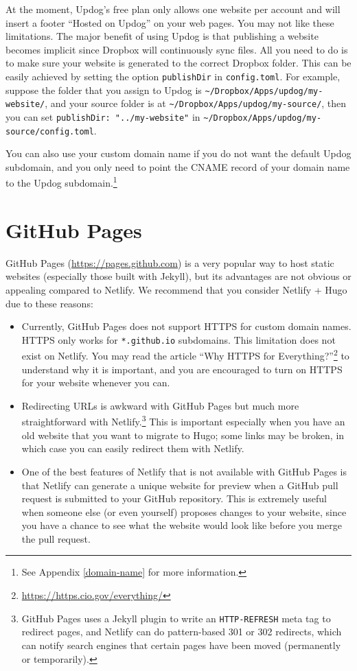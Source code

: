 \documentclass[12pt,]{krantz}
\renewcommand{\href}[2]{#2\footnote{\url{#1}}}
\theoremstyle{definition}
\theoremstyle{definition}
\theoremstyle{definition}
\theoremstyle{remark}
\begin{document}
At the moment, Updog's free plan only allows one website per account and
will insert a footer ``Hosted on Updog'' on your web pages. You may not
like these limitations. The major benefit of using Updog is that
publishing a website becomes implicit since Dropbox will continuously
sync files. All you need to do is to make sure your website is generated
to the correct Dropbox folder. This can be easily achieved by setting
the option \texttt{publishDir} in \texttt{config.toml}. For example,
suppose the folder that you assign to Updog is
\texttt{\textasciitilde{}/Dropbox/Apps/updog/my-website/}, and your
source folder is at
\texttt{\textasciitilde{}/Dropbox/Apps/updog/my-source/}, then you can
set \texttt{publishDir:\ "../my-website"} in
\texttt{\textasciitilde{}/Dropbox/Apps/updog/my-source/config.toml}.

You can also use your custom domain name if you do not want the default
Updog subdomain, and you only need to point the CNAME record of your
domain name to the Updog subdomain.\footnote{See Appendix
  \ref{domain-name} for more information.}

\section{GitHub Pages}\label{github-pages}

GitHub Pages (\url{https://pages.github.com})  is a
very popular way to host static websites (especially those built with
Jekyll), but its advantages are not obvious or appealing compared to
Netlify. We recommend that you consider Netlify + Hugo due to these
reasons:

\begin{itemize}
\item
  Currently, GitHub Pages does not support HTTPS for custom domain
  names. HTTPS only works for \texttt{*.github.io} subdomains. This
  limitation does not exist on Netlify. You may read the article
  \href{https://https.cio.gov/everything/}{``Why HTTPS for
  Everything?''} to understand why it is important, and you are
  encouraged to turn on HTTPS for your website whenever you can.
\item
  Redirecting URLs is awkward with GitHub Pages but much more
  straightforward with Netlify.\footnote{GitHub Pages uses a Jekyll
    plugin to write an \texttt{HTTP-REFRESH} meta tag to redirect pages,
    and Netlify can do pattern-based 301 or 302 redirects, which can
    notify search engines that certain pages have been moved
    (permanently or temporarily).} This is important especially when you
  have an old website that you want to migrate to Hugo; some links may
  be broken, in which case you can easily redirect them with Netlify.
\item
  One of the best features of Netlify that is not available with GitHub
  Pages is that Netlify can generate a unique website for preview when a
  GitHub pull request is submitted to your GitHub repository. This is
  extremely useful when someone else (or even yourself) proposes changes
  to your website, since you have a chance to see what the website would
  look like before you merge the pull request.
\end{itemize}
\end{document}
